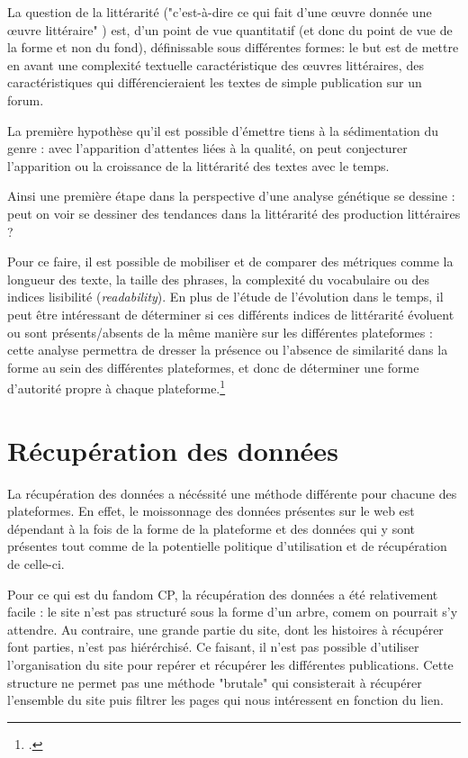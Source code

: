 \documentclass[12pt,a4paper,oneside,titlepage]{article} %
\begin{document}
	La question de la littérarité ("c'est-à-dire ce qui fait d'une œuvre donnée une œuvre littéraire" ) est, d'un point de vue quantitatif (et donc du point de vue de la forme et non du fond), définissable sous différentes formes: le but est de mettre en avant une complexité textuelle caractéristique des œuvres littéraires, des caractéristiques qui différencieraient les textes de simple publication sur un forum.

	La première hypothèse qu'il est possible d'émettre tiens à la sédimentation du genre : avec l'apparition d'attentes liées à la qualité, on peut conjecturer l'apparition ou la croissance de la littérarité des textes avec le temps.

	Ainsi une première étape dans la perspective d'une analyse génétique se dessine : peut on voir se dessiner des tendances dans la littérarité des production littéraires ? 


	Pour ce faire, il est possible de mobiliser et de comparer des métriques comme la longueur des texte, la taille des phrases, la complexité du vocabulaire ou des indices lisibilité (\textit{readability}). 
	En plus de l'étude de l'évolution dans le temps, il peut être intéressant de déterminer si ces différents indices de littérarité évoluent ou sont présents/absents de la même manière sur les différentes plateformes : cette analyse permettra de dresser la présence ou l'absence de similarité dans la forme au sein des différentes plateformes, et donc de déterminer une forme d'autorité propre à chaque plateforme.\footcite{mayer_autorite_2017}
	
	
	\section*{Récupération des données}
	
	La récupération des données a nécéssité une méthode différente pour chacune des plateformes.  En effet, le moissonnage des données présentes sur le web est dépendant à la fois de la forme de la plateforme et des données qui y sont présentes tout comme de la potentielle politique d'utilisation et de récupération de celle-ci. 
	
	Pour ce qui est du fandom CP, la récupération des données a été relativement facile : le site n'est pas structuré sous la forme d'un arbre, comem on pourrait s'y attendre. Au contraire, une grande partie du site, dont les histoires à récupérer font parties, n'est pas hiérérchisé. Ce faisant, il n'est pas possible d'utiliser l'organisation du site pour repérer et récupérer les différentes publications.
	Cette structure ne permet pas une méthode "brutale" qui consisterait à récupérer l'ensemble du site puis filtrer les pages qui nous intéressent en fonction du lien.
	
\end{document}
